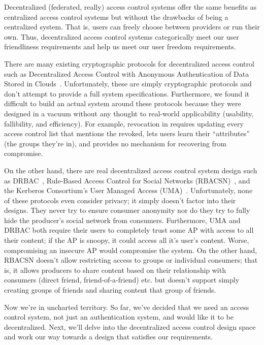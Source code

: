 \documentclass[pdftex,12pt,a4papaer,twoside,notitlepage]{report}
\begin{document}
Decentralized (federated, really) access control systems offer the same benefits
as centralized access control systems but without the drawbacks of being a
centralized system. That is, users can freely choose between providers or run
their own. Thus, decentralized access control systems categorically meet our
user friendliness requirements and help us meet our user freedom requirements.

There are many existing cryptographic protocols for decentralized access control
such as Decentralized Access Control with Anonymous Authentication of Data
Stored in Clouds~\cite{attrib}. Unfortunately, these are simply cryptographic
protocols and don't attempt to provide a full system specifications.
Furthermore, we found it difficult to build an actual system around these
protocols because they were designed in a vacuum without any thought to
real-world applicability (usability, fallibility, and efficiency). For example,
revocation in \cite{attrib} requires updating every access control list that
mentions the revoked, lets users learn their ``attributes'' (the groups they're
in), and provides no mechanism for recovering from compromise.

On the other hand, there are real decentralized access control system design
such as DRBAC~\cite{drbac}, Rule-Based Access Control for Social Networks
(RBACSN)~\cite{socnet}, and the Kerberos Consortium's User Managed Access
(UMA)~\cite{uma}. Unfortunately, none of these protocols even consider privacy;
it simply doesn't factor into their designs. They never try to ensure consumer
anonymity nor do they try to fully hide the producer's social network from
consumers. Furthermore, UMA and DRBAC both require their users to completely
trust some AP with access to all their content; if the AP is snoopy, it could
access all it's user's content. Worse, compromising an insecure AP would
compromise the system. On the other hand, RBACSN doesn't allow restricting
access to groups or individual consumers; that is, it allows producers to share
content based on their relationship with consumers (direct friend,
friend-of-a-friend) etc. but doesn't support simply creating groups of friends
and sharing content that group of friends.

Now we're in uncharted territory. So far, we've decided that we need an access
control system, not just an authentication system, and would like it to be
decentralized. Next, we'll delve into the decentralized access control design
space and work our way towards a design that satisfies our requirements.
\end{document}
